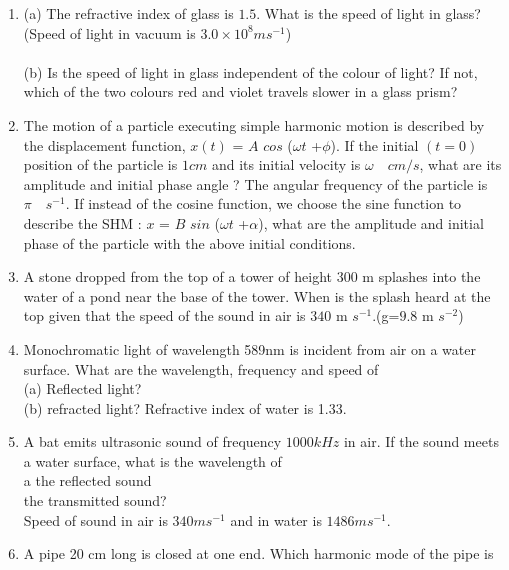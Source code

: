 \begin{enumerate}[label=\thesection.\arabic*,ref=\thesection.\theenumi]
\item
(a) The refractive index of glass is $1.5$. What is the speed of light in
glass?(Speed of light in vacuum is $3.0\times 10^{8} m s^{-1}$) \\
\\
(b) Is the speed of light in glass independent of the colour of light? If
not, which of the two colours red and violet travels slower in a
glass prism?\\
\solution
\pagebreak
\item
The motion of a particle executing simple harmonic motion is described by the
displacement function, $x(t)$ = $A$ $cos$ ($\omega$$t$ +$\phi$).
If the initial $(t = 0)$ position of the particle is $1 cm$ and its initial velocity is $\omega\quad cm/s$, what are its amplitude and initial phase angle ? The angular frequency of the particle is $\pi\quad s^{-1}$. If instead of the cosine function, we choose the sine function to describe the SHM : $x$ = $B$ $sin$ ($\omega$$t$ +$\alpha$), what are the amplitude and initial phase of the
particle with the above initial conditions.\\
\solution

\pagebreak

\item A stone dropped from the top of a tower of height $300$ m splashes into the water of a pond near the base of the tower. When is the splash heard at the top given that the speed of the sound in air is $340$ m $s^{-1}$.(g=$9.8$ m $s^{-2}$)\\
\solution
\pagebreak

\item Monochromatic light of wavelength 589nm is incident from air on a
water surface. What are the wavelength, frequency and speed of\\
(a) Reflected light?\\
(b) refracted light? Refractive index of water is 1.33.\\
\solution
\pagebreak
\item A bat emits ultrasonic sound of frequency $1000 kHz$ in air. If the sound meets a water surface, what is the wavelength of\\[0pt] \brak a the reflected sound \\[0pt]
 the transmitted sound?\\
Speed of sound in air is $340 ms^{-1}$ and in water is $1486 ms^{-1}$.\\
\solution
\pagebreak

\item A pipe 20 cm long is closed at one end. Which harmonic mode of the pipe is


\end{enumerate}
